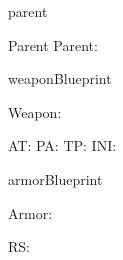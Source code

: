 \documentclass[12pt]{pnpprep}
\begin{document}
\begin{blueprint}{parent}


    \begin{render}
        \begin{panel}{Parent}
            Parent: \namevalue
            \par

            \renderChildren
        \end{panel}
    \end{render}
\end{blueprint}


\begin{blueprint}{weaponBlueprint}

    \begin{render}
        Weapon: \namevalue
        \par
        AT: \ATvalue
        \quad
        PA: \PAvalue
        \quad
        TP: \TPvalue
        \quad
        INI: \INIvalue
        \par
    \end{render}
\end{blueprint}


\begin{blueprint}{armorBlueprint}

    \begin{render}
        Armor: \namevalue
        \par
        RS: \RSvalue
        \par
    \end{render}
\end{blueprint}


\begin{parent}

    \begin{weapon}
    \end{weapon}

    \begin{armor}
    \end{armor}

\end{parent}
\end{document}

